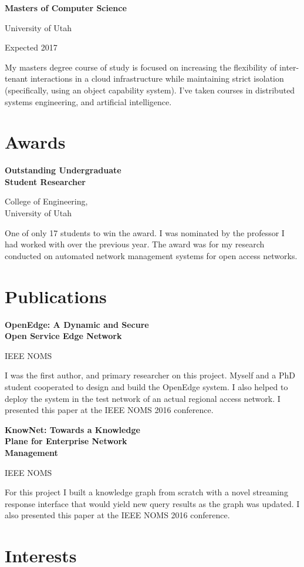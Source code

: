 \documentclass[10pt]{article}
\newcommand{\triline}[3]{%
    \parbox[t][][t]{.4\linewidth}{ #1 }%
    \parbox[t][][t]{.4\linewidth}{ #2 }%
    \parbox[t][][t]{.2\linewidth}{\raggedleft #3 }%
    \vspace{1ex}
}
\begin{document}
\vspace{1.5ex}
\triline{\bf Masters of Computer Science}{University of Utah}{Expected 2017}

My masters degree course of study is focused on increasing the flexibility of 
inter-tenant interactions in a cloud infrastructure while maintaining
strict isolation (specifically, using an object capability system). I've taken
courses in distributed systems engineering, and artificial intelligence.

\section{Awards}

\triline{\small \bf Outstanding Undergraduate \\ Student Researcher}{College of Engineering, \\ University of Utah}{2015}

One of only 17 students to win the award. I was nominated by the professor
I had worked with over the previous year. The award was for my research
conducted on automated network management systems for open access networks.

\section{Publications}

\triline{\small \bf OpenEdge: A Dynamic and Secure \\ Open Service Edge Network}{IEEE NOMS}{2016}

I was the first author, and primary researcher on this project. Myself and a PhD
student cooperated to design and build the OpenEdge system. I also helped to deploy
the system in the test network of an actual regional access network. I presented
this paper at the IEEE NOMS 2016 conference.

\vspace{1ex}
\triline{\small \bf KnowNet: Towards a Knowledge \\ Plane for Enterprise Network \\ Management}{IEEE NOMS}{2016}

For this project I built a knowledge graph from scratch with a novel streaming
response interface that would yield new query results as the graph was updated. 
I also presented this paper at the IEEE NOMS 2016 conference.

\section{Interests}
\end{document}
